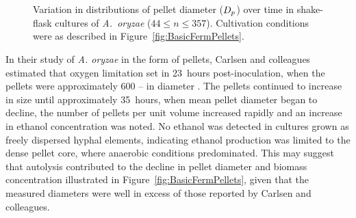 \begin{figure}[htbp]
	\centering
	\hspace{1cm}
	\\
	\hspace{1cm}
	\\
  \caption{Variation in distributions of pellet diameter ($D_p$) over time in shake-flask cultures of \emph{A.~oryzae} ($44 \leq n \leq 357$). Cultivation conditions were as described in Figure~\ref{fig:BasicFermPellets}.}
  \label{fig:DpDist}
\end{figure}

In their study of \emph{A. oryzae} in the form of pellets, Carlsen and colleagues estimated that oxygen limitation set in 23~hours post-inoculation, when the pellets were approximately 600 --  in diameter \cite{carlsen1996a}. The pellets continued to increase in size until approximately 35~hours, when mean pellet diameter began to decline, the number of pellets per unit volume increased rapidly and an increase in ethanol concentration was noted. No ethanol was detected in cultures grown as freely dispersed hyphal elements, indicating ethanol production was limited to the dense pellet core, where anaerobic conditions predominated. This may suggest that autolysis contributed to the decline in pellet diameter and biomass concentration illustrated in Figure~\ref{fig:BasicFermPellets}, given that the measured diameters were well in excess of those reported by Carlsen and colleagues.

